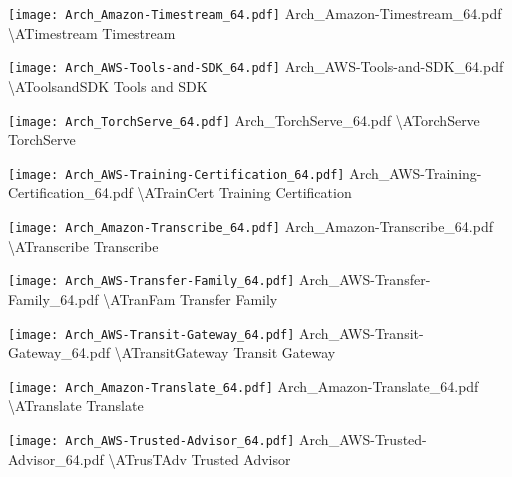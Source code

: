  {\texttt{[image: Arch\_Amazon-Timestream\_64.pdf]}} {Arch\_Amazon-Timestream\_64.pdf} {{\textbackslash}ATimestream} {Timestream}

 {\texttt{[image: Arch\_AWS-Tools-and-SDK\_64.pdf]}} {Arch\_AWS-Tools-and-SDK\_64.pdf} {{\textbackslash}AToolsandSDK} {Tools and SDK}

 {\texttt{[image: Arch\_TorchServe\_64.pdf]}} {Arch\_TorchServe\_64.pdf} {{\textbackslash}ATorchServe} {TorchServe}

 {\texttt{[image: Arch\_AWS-Training-Certification\_64.pdf]}} {Arch\_AWS-Training-Certification\_64.pdf} {{\textbackslash}ATrainCert} {Training Certification}

 {\texttt{[image: Arch\_Amazon-Transcribe\_64.pdf]}} {Arch\_Amazon-Transcribe\_64.pdf} {{\textbackslash}ATranscribe} {Transcribe}

 {\texttt{[image: Arch\_AWS-Transfer-Family\_64.pdf]}} {Arch\_AWS-Transfer-Family\_64.pdf} {{\textbackslash}ATranFam} {Transfer Family}

 {\texttt{[image: Arch\_AWS-Transit-Gateway\_64.pdf]}} {Arch\_AWS-Transit-Gateway\_64.pdf} {{\textbackslash}ATransitGateway} {Transit Gateway}

 {\texttt{[image: Arch\_Amazon-Translate\_64.pdf]}} {Arch\_Amazon-Translate\_64.pdf} {{\textbackslash}ATranslate} {Translate}

 {\texttt{[image: Arch\_AWS-Trusted-Advisor\_64.pdf]}} {Arch\_AWS-Trusted-Advisor\_64.pdf} {{\textbackslash}ATrusTAdv} {Trusted Advisor}

